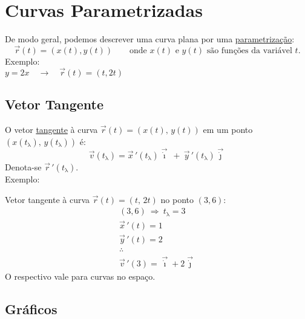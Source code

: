 \documentclass{article}
\begin{document}
\section{Curvas Parametrizadas}
De modo geral, podemos descrever uma curva plana por uma \uline{parametrização}:
\[ \vec{r}(t) = (x(t), y(t)) \qquad \text{onde $x(t)$ e $y(t)$ são funções da variável $t$.} \]
Exemplo: \\[-5pt]

$y = 2x \quad \rightarrow \quad \vec{r}(t) = (t, 2t)$

\subsection{Vetor Tangente}
O vetor \uline{tangente} \`a curva $\vec{r}(t) = (x(t),\, y(t))$ em um ponto $(x(t_\uplambda),\, y(t_\uplambda))$ é:
\[ \vec{v}(t_\uplambda) = \vec{x}\,'(t_\uplambda)\vec{\dot{\imath}} \> + \> \vec{y}\,'(t_\uplambda)\vec{\dot{\jmath}} \]
Denota-se $\vec{r}\,'(t_\uplambda)$. \\[5pt]
Exemplo:

Vetor tangente \`a curva $\vec{r}(t) = (t,\, 2t)$ no ponto $(3, 6)$:
\begin{gather*}
  (3, 6) \>\Rightarrow\> t_\uplambda = 3 \\[5pt]
  \vec{x}\,'(t) = 1 \\
  \vec{y}\,'(t) = 2 \\
  \therefore \\
  \vec{v}\,'(3) = \vec{\dot{\imath}} + 2\vec{\dot{\jmath}}
\end{gather*}
O respectivo vale para curvas no espaço.

\subsection{Gráficos}
\end{document}
